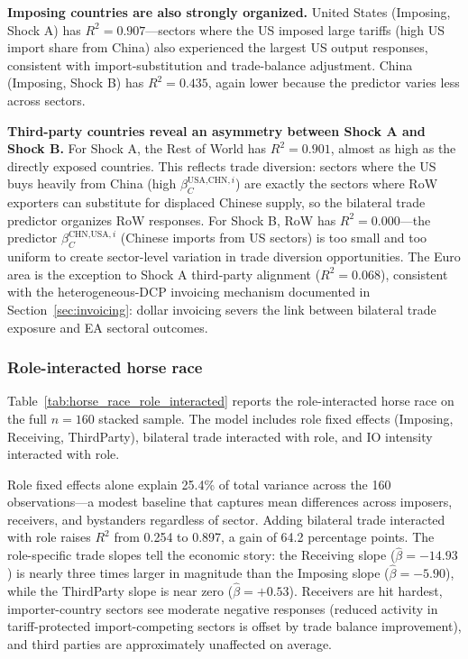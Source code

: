 \textbf{Imposing countries are also strongly organized.} United States (Imposing, Shock A) has $R^2 = 0.907$---sectors where the US imposed large tariffs (high US import share from China) also experienced the largest US output responses, consistent with import-substitution and trade-balance adjustment. China (Imposing, Shock B) has $R^2 = 0.435$, again lower because the predictor varies less across sectors.

\textbf{Third-party countries reveal an asymmetry between Shock A and Shock B.} For Shock A, the Rest of World has $R^2 = 0.901$, almost as high as the directly exposed countries. This reflects trade diversion: sectors where the US buys heavily from China (high $\beta_C^{\text{USA,CHN},i}$) are exactly the sectors where RoW exporters can substitute for displaced Chinese supply, so the bilateral trade predictor organizes RoW responses. For Shock B, RoW has $R^2 = 0.000$---the predictor $\beta_C^{\text{CHN,USA},i}$ (Chinese imports from US sectors) is too small and too uniform to create sector-level variation in trade diversion opportunities. The Euro area is the exception to Shock A third-party alignment ($R^2 = 0.068$), consistent with the heterogeneous-DCP invoicing mechanism documented in Section~\ref{sec:invoicing}: dollar invoicing severs the link between bilateral trade exposure and EA sectoral outcomes.

\subsubsection*{Role-interacted horse race}

Table~\ref{tab:horse_race_role_interacted} reports the role-interacted horse race on the full $n=160$ stacked sample. The model includes role fixed effects (Imposing, Receiving, ThirdParty), bilateral trade interacted with role, and IO intensity interacted with role.



Role fixed effects alone explain 25.4\% of total variance across the 160 observations---a modest baseline that captures mean differences across imposers, receivers, and bystanders regardless of sector. Adding bilateral trade interacted with role raises $R^2$ from 0.254 to 0.897, a gain of 64.2 percentage points. The role-specific trade slopes tell the economic story: the Receiving slope ($\hat{\beta} = -14.93$) is nearly three times larger in magnitude than the Imposing slope ($\hat{\beta} = -5.90$), while the ThirdParty slope is near zero ($\hat{\beta} = +0.53$). Receivers are hit hardest, importer-country sectors see moderate negative responses (reduced activity in tariff-protected import-competing sectors is offset by trade balance improvement), and third parties are approximately unaffected on average.

